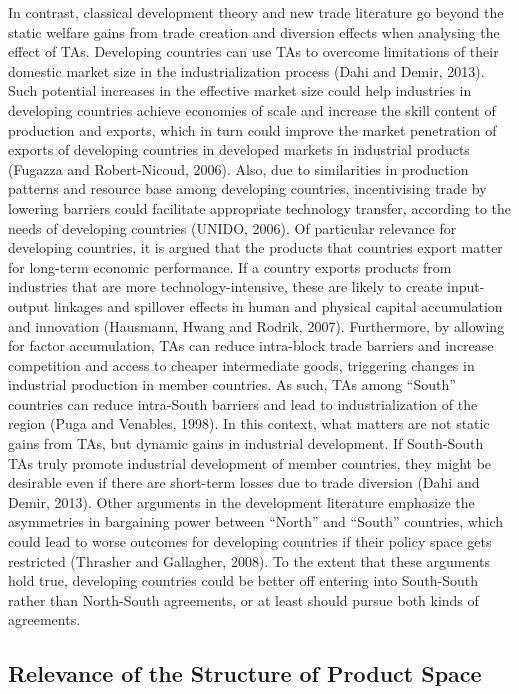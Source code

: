 \documentclass[12pt]{article}%
\begin{document}
%
In contrast, classical development theory and new trade literature go
beyond the static welfare gains from trade creation and diversion
effects when analysing the effect of TAs. Developing countries can use
TAs to overcome limitations of their domestic market size in the
industrialization process (Dahi and Demir, 2013). Such potential
increases in the effective market size could help industries in
developing countries achieve economies of scale and increase the skill
content of production and exports, which in turn could improve the
market penetration of exports of developing countries in developed
markets in industrial products (Fugazza and Robert-Nicoud, 2006). Also,
due to similarities in production patterns and resource base among
developing countries, incentivising trade by lowering barriers could
facilitate appropriate technology transfer, according to the needs of
developing countries (UNIDO, 2006). Of particular relevance for
developing countries, it is argued that the products that countries
export matter for long-term economic performance. If a country exports
products from industries that are more technology-intensive, these are
likely to create input-output linkages and spillover effects in human
and physical capital accumulation and innovation (Hausmann, Hwang and
Rodrik, 2007). Furthermore, by allowing for factor accumulation, TAs can
reduce intra-block trade barriers and increase competition and access to
cheaper intermediate goods, triggering changes in industrial production
in member countries. As such, TAs among ``South'' countries can reduce
intra-South barriers and lead to industrialization of the region (Puga
and Venables, 1998). In this context, what matters are not static gains
from TAs, but dynamic gains in industrial development. If South-South
TAs truly promote industrial development of member countries, they might
be desirable even if there are short-term losses due to trade diversion
(Dahi and Demir, 2013). Other arguments in the development literature
emphasize the asymmetries in bargaining power between ``North'' and
``South'' countries, which could lead to worse outcomes for developing
countries if their policy space gets restricted (Thrasher and Gallagher,
2008). To the extent that these arguments hold true, developing
countries could be better off entering into South-South rather than
North-South agreements, or at least should pursue both kinds of
agreements.

%
\subsection{Relevance of the Structure of Product Space}%
\label{subsec:RelevanceoftheStructureofProductSpace}%
\end{document}

